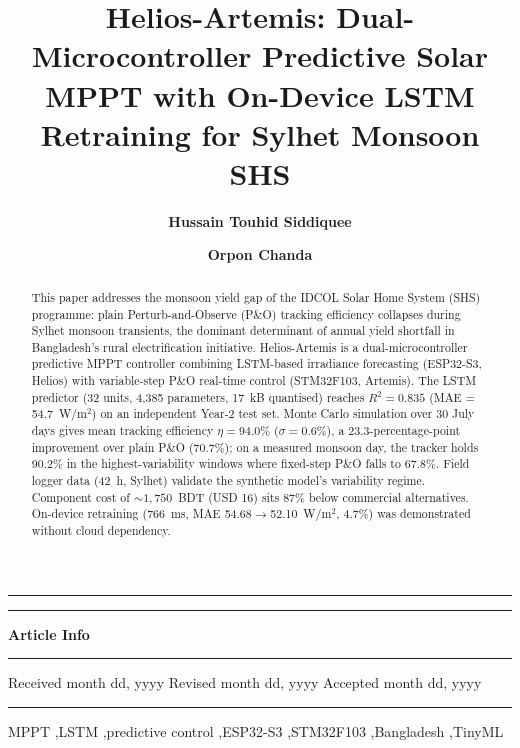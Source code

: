 \documentclass{iaesarticle}
\author[1]{\bfseries Hussain Touhid Siddiquee}
\author[2]{\bfseries Orpon Chanda}
\affil[1]{Department of Electrical and Electronic Engineering, Leading University, Sylhet, Bangladesh}
\affil[2]{Department of Electrical and Electronic Engineering, Leading University, Sylhet, Bangladesh}
\title{Helios-Artemis: Dual-Microcontroller Predictive Solar MPPT with On-Device LSTM Retraining for Sylhet Monsoon SHS}
\begin{document}
\setcounter{page}{1}
\setlength{\parindent}{1.27cm}
\pagestyle{fancy}
\fancyhfoffset{0cm}


\maketitle

\hrule
\vspace{.1em}
\hrule
\vspace{.5em}
\noindent
\parbox[t][][s]{0.315\textwidth}{%
\textbf{Article Info}
\vspace{.5em}
\hrule
\vspace{.5em}
\begin{history}
\vspace{.5em}
Received month dd, yyyy
Revised month dd, yyyy
Accepted month dd, yyyy
\vspace{.7em}
\end{history}
\vspace{.5em}
\hrule
\vspace{.5em}
\begin{keyword}
\vspace{.5em}
MPPT \sep LSTM \sep predictive control \sep ESP32-S3 \sep STM32F103 \sep Bangladesh \sep TinyML
\vspace{.5em}
\end{keyword}
\vspace{\fill}
}
\parbox{0.020\textwidth}{\hspace{0.5em}}
\parbox[t][][s]{0.65\textwidth}{%
\begin{abstract}
\vspace{.3em}
This paper addresses the monsoon yield gap of the IDCOL Solar Home System (SHS) programme: plain Perturb-and-Observe (P\&O) tracking efficiency collapses during Sylhet monsoon transients, the dominant determinant of annual yield shortfall in Bangladesh's rural electrification initiative. Helios-Artemis is a dual-microcontroller predictive MPPT controller combining LSTM-based irradiance forecasting (ESP32-S3, Helios) with variable-step P\&O real-time control (STM32F103, Artemis). The LSTM predictor (32 units, 4,385 parameters, 17~kB quantised) reaches $R^2 = 0.835$ (MAE = 54.7~W/m$^2$) on an independent Year-2 test set. Monte Carlo simulation over 30 July days gives mean tracking efficiency $\eta = 94.0\%$ ($\sigma = 0.6\%$), a 23.3-percentage-point improvement over plain P\&O (70.7\%); on a measured monsoon day, the tracker holds 90.2\% in the highest-variability windows where fixed-step P\&O falls to 67.8\%. Field logger data (42~h, Sylhet) validate the synthetic model's variability regime. Component cost of ${\sim}1{,}750$~BDT (USD 16) sits 87\% below commercial alternatives. On-device retraining (766~ms, MAE 54.68$\rightarrow$52.10~W/m$^2$, 4.7\%) was demonstrated without cloud dependency.
\end{abstract}
}
\end{document}
